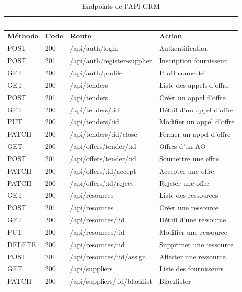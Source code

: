 \documentclass[12pt,a4paper]{report}
\begin{document}
\begin{longtable}{|L{2.5cm}|L{2cm}|L{4cm}|L{5cm}|}
\caption{Endpoints de l'API GRM} \\
\hline
{}\textcolor{white}{\textbf{Méthode}} & \textcolor{white}{\textbf{Code}} & \textcolor{white}{\textbf{Route}} & \textcolor{white}{\textbf{Action}} \\
\hline
\endfirsthead
\hline
\textbf{Méthode} & \textbf{Code} & \textbf{Route} & \textbf{Action} \\
\hline
\endhead
POST & 200 & /api/auth/login & Authentification \\
\hline
POST & 201 & /api/auth/register-supplier & Inscription fournisseur \\
\hline
GET & 200 & /api/auth/profile & Profil connecté \\
\hline
GET & 200 & /api/tenders & Liste des appels d'offre \\
\hline
POST & 201 & /api/tenders & Créer un appel d'offre \\
\hline
GET & 200 & /api/tenders/:id & Détail d'un appel d'offre \\
\hline
PUT & 200 & /api/tenders/:id & Modifier un appel d'offre \\
\hline
PATCH & 200 & /api/tenders/:id/close & Fermer un appel d'offre \\
\hline
GET & 200 & /api/offers/tender/:id & Offres d'un AO \\
\hline
POST & 201 & /api/offers/tender/:id & Soumettre une offre \\
\hline
PATCH & 200 & /api/offers/:id/accept & Accepter une offre \\
\hline
PATCH & 200 & /api/offers/:id/reject & Rejeter une offre \\
\hline
GET & 200 & /api/resources & Liste des ressources \\
\hline
POST & 201 & /api/resources & Créer une ressource \\
\hline
GET & 200 & /api/resources/:id & Détail d'une ressource \\
\hline
PUT & 200 & /api/resources/:id & Modifier une ressource \\
\hline
DELETE & 200 & /api/resources/:id & Supprimer une ressource \\
\hline
POST & 201 & /api/resources/:id/assign & Affecter une ressource \\
\hline
GET & 200 & /api/suppliers & Liste des fournisseurs \\
\hline
PATCH & 200 & /api/suppliers/:id/blacklist & Blacklister \\

\end{longtable}
\end{document}
